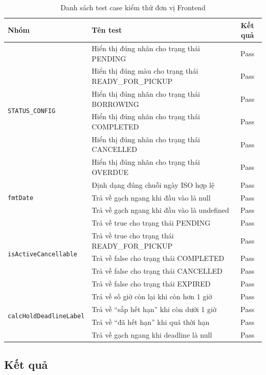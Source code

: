 \begin{table}[h]
\centering
\caption{Danh sách test case kiểm thử đơn vị Frontend}
\label{tab:unit_fe}
\begin{tabular}{|l|p{6cm}|c|}
\hline
\textbf{Nhóm} & \textbf{Tên test} & \textbf{Kết quả} \\
\hline
\multirow{6}{*}{\texttt{STATUS\_CONFIG}}
  & Hiển thị đúng nhãn cho trạng thái PENDING & Pass \\
\cline{2-3}
  & Hiển thị đúng màu cho trạng thái READY\_FOR\_PICKUP & Pass \\
\cline{2-3}
  & Hiển thị đúng nhãn cho trạng thái BORROWING & Pass \\
\cline{2-3}
  & Hiển thị đúng nhãn cho trạng thái COMPLETED & Pass \\
\cline{2-3}
  & Hiển thị đúng nhãn cho trạng thái CANCELLED & Pass \\
\cline{2-3}
  & Hiển thị đúng nhãn cho trạng thái OVERDUE & Pass \\
\hline
\multirow{3}{*}{\texttt{fmtDate}}
  & Định dạng đúng chuỗi ngày ISO hợp lệ & Pass \\
\cline{2-3}
  & Trả về gạch ngang khi đầu vào là null & Pass \\
\cline{2-3}
  & Trả về gạch ngang khi đầu vào là undefined & Pass \\
\hline
\multirow{5}{*}{\texttt{isActiveCancellable}}
  & Trả về true cho trạng thái PENDING & Pass \\
\cline{2-3}
  & Trả về true cho trạng thái READY\_FOR\_PICKUP & Pass \\
\cline{2-3}
  & Trả về false cho trạng thái COMPLETED & Pass \\
\cline{2-3}
  & Trả về false cho trạng thái CANCELLED & Pass \\
\cline{2-3}
  & Trả về false cho trạng thái EXPIRED & Pass \\
\hline
\multirow{4}{*}{\texttt{calcHoldDeadlineLabel}}
  & Trả về số giờ còn lại khi còn hơn 1 giờ & Pass \\
\cline{2-3}
  & Trả về ``sắp hết hạn'' khi còn dưới 1 giờ & Pass \\
\cline{2-3}
  & Trả về ``đã hết hạn'' khi quá thời hạn & Pass \\
\cline{2-3}
  & Trả về gạch ngang khi deadline là null & Pass \\
\hline
\end{tabular}
\end{table}

\subsection{Kết quả}

